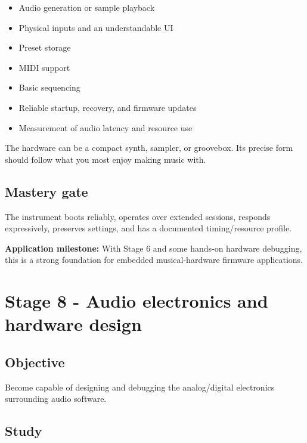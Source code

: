 \documentclass[11pt,letterpaper]{article}
\begin{document}
\begin{itemize}
\item Audio generation or sample playback
\item Physical inputs and an understandable UI
\item Preset storage
\item MIDI support
\item Basic sequencing
\item Reliable startup, recovery, and firmware updates
\item Measurement of audio latency and resource use
\end{itemize}

The hardware can be a compact synth, sampler, or groovebox. Its precise form should follow what you most enjoy making music with.

\subsection*{Mastery gate}\label{mastery-gate-7}

The instrument boots reliably, operates over extended sessions, responds expressively, preserves settings, and has a documented timing/resource profile.

\textbf{Application milestone:} With Stage 6 and some hands-on hardware debugging, this is a strong foundation for embedded musical-hardware firmware applications.

\clearpage

\section{Stage 8 - Audio electronics and hardware design}\label{stage-8-audio-electronics-and-hardware-design}

\subsection*{Objective}\label{objective-8}

Become capable of designing and debugging the analog/digital electronics surrounding audio software.

\subsection*{Study}\label{study-5}
\end{document}
